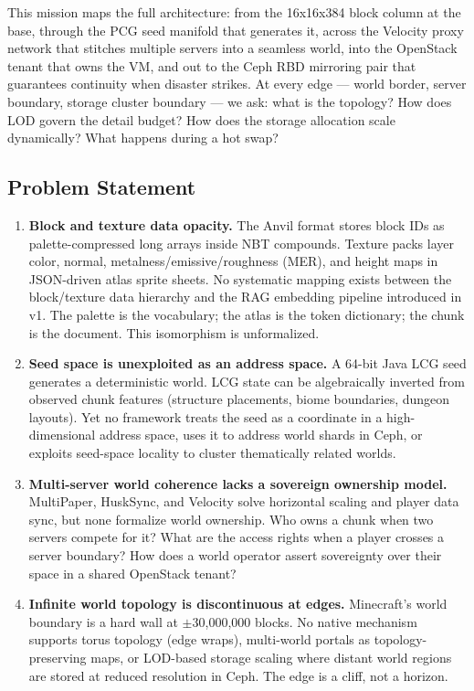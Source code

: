 \documentclass[11pt,letterpaper]{article}
\begin{document}
This mission maps the full architecture: from the 16x16x384 block column at the base, through the PCG seed manifold that generates it, across the Velocity proxy network that stitches multiple servers into a seamless world, into the OpenStack tenant that owns the VM, and out to the Ceph RBD mirroring pair that guarantees continuity when disaster strikes. At every edge --- world border, server boundary, storage cluster boundary --- we ask: what is the topology? How does LOD govern the detail budget? How does the storage allocation scale dynamically? What happens during a hot swap?

\subsection{Problem Statement}

\begin{enumerate}
  \item \textbf{Block and texture data opacity.} The Anvil format stores block IDs as palette-compressed long arrays inside NBT compounds. Texture packs layer color, normal, metalness/emissive/roughness (MER), and height maps in JSON-driven atlas sprite sheets. No systematic mapping exists between the block/texture data hierarchy and the RAG embedding pipeline introduced in v1. The palette is the vocabulary; the atlas is the token dictionary; the chunk is the document. This isomorphism is unformalized.

  \item \textbf{Seed space is unexploited as an address space.} A 64-bit Java LCG seed generates a deterministic world. LCG state can be algebraically inverted from observed chunk features (structure placements, biome boundaries, dungeon layouts). Yet no framework treats the seed as a coordinate in a high-dimensional address space, uses it to address world shards in Ceph, or exploits seed-space locality to cluster thematically related worlds.

  \item \textbf{Multi-server world coherence lacks a sovereign ownership model.} MultiPaper, HuskSync, and Velocity solve horizontal scaling and player data sync, but none formalize world ownership. Who owns a chunk when two servers compete for it? What are the access rights when a player crosses a server boundary? How does a world operator assert sovereignty over their space in a shared OpenStack tenant?

  \item \textbf{Infinite world topology is discontinuous at edges.} Minecraft's world boundary is a hard wall at $\pm$30,000,000 blocks. No native mechanism supports torus topology (edge wraps), multi-world portals as topology-preserving maps, or LOD-based storage scaling where distant world regions are stored at reduced resolution in Ceph. The edge is a cliff, not a horizon.


\end{enumerate}
\end{document}

